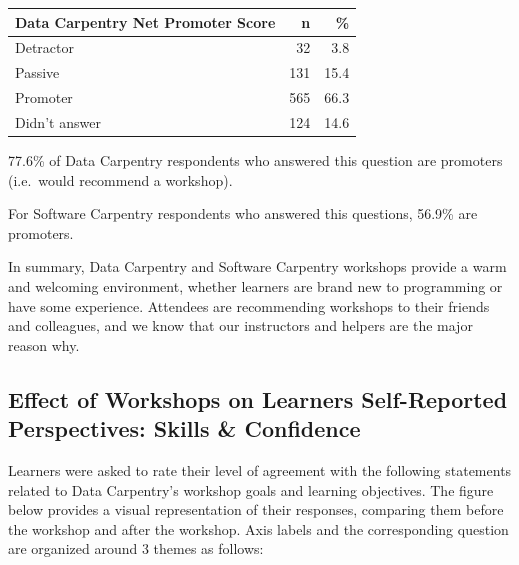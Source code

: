 \documentclass[]{article}
\begin{document}
\begin{longtable}[]{@{}lrr@{}}
\toprule
Data Carpentry Net Promoter Score & n & \%\tabularnewline
\midrule
\endhead
Detractor & 32 & 3.8\tabularnewline
Passive & 131 & 15.4\tabularnewline
Promoter & 565 & 66.3\tabularnewline
Didn't answer & 124 & 14.6\tabularnewline
\bottomrule
\end{longtable}

77.6\% of Data Carpentry respondents who answered this question are
promoters (i.e.~would recommend a workshop).

For Software Carpentry respondents who answered this questions, 56.9\%
are promoters.

In summary, Data Carpentry and Software Carpentry workshops provide a
warm and welcoming environment, whether learners are brand new to
programming or have some experience. Attendees are recommending
workshops to their friends and colleagues, and we know that our
instructors and helpers are the major reason why.

\subsection{Effect of Workshops on Learners Self-Reported Perspectives:
Skills \&
Confidence}\label{effect-of-workshops-on-learners-self-reported-perspectives-skills-confidence}

Learners were asked to rate their level of agreement with the following
statements related to Data Carpentry's workshop goals and learning
objectives. The figure below provides a visual representation of their
responses, comparing them before the workshop and after the workshop.
Axis labels and the corresponding question are organized around 3 themes
as follows:
\end{document}
